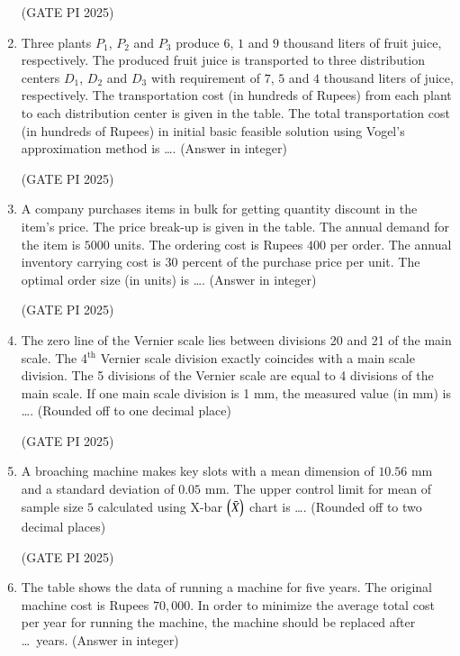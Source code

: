 \documentclass[journal,12pt,onecolumn]{IEEEtran}
\theoremstyle{remark}
\begin{document}
\begin{enumerate}

\hfill (GATE PI 2025)

\item Three plants $P_{1}$, $P_{2}$ and $P_{3}$ produce $6$, $1$ and $9$ thousand liters of fruit juice, respectively. The produced fruit juice is transported to three distribution centers $D_{1}$, $D_{2}$ and $D_{3}$ with requirement of $7$, $5$ and $4$ thousand liters of juice, respectively. The transportation cost (in hundreds of Rupees) from each plant to each distribution center is given in the table. The total transportation cost (in hundreds of Rupees) in initial basic feasible solution using Vogel's approximation method is \dots. (Answer in integer)



\hfill (GATE PI 2025)

\item A company purchases items in bulk for getting quantity discount in the item's price. The price break-up is given in the table. The annual demand for the item is $5000$ units. The ordering cost is Rupees $400$ per order. The annual inventory carrying cost is $30$ percent of the purchase price per unit. The optimal order size (in units) is \dots. (Answer in integer)



\hfill (GATE PI 2025)

 \item The zero line of the Vernier scale lies between divisions 20 and 21 of the main scale. The 4$^{\text{th}}$ Vernier scale division exactly coincides with a main scale division. The 5 divisions of the Vernier scale are equal to 4 divisions of the main scale. If one main scale division is 1 mm, the measured value (in mm) is \dots. (Rounded off to one decimal place)

\hfill (GATE PI 2025)

\item A broaching machine makes key slots with a mean dimension of $10.56$ mm and a standard deviation of $0.05$ mm. The upper control limit for mean of sample size $5$ calculated using X-bar $\left(\bar{X}\right)$ chart is \dots. (Rounded off to two decimal places)

\hfill (GATE PI 2025)

\item The table shows the data of running a machine for five years. The original machine cost is Rupees $70,000$. In order to minimize the average total cost per year for running the machine, the machine should be replaced after \dots\ years. (Answer in integer)


\end{enumerate}
\end{document}
